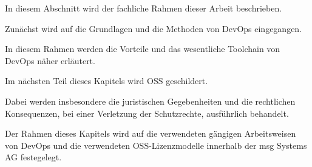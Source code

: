 In diesem Abschnitt wird der fachliche Rahmen dieser Arbeit beschrieben. 

Zunächst wird auf die Grundlagen und die Methoden von DevOps eingegangen. 

In diesem Rahmen werden die Vorteile und das wesentliche Toolchain von DevOps näher erläutert.  

Im nächsten Teil dieses Kapitels wird OSS geschildert. 

Dabei werden insbesondere die juristischen Gegebenheiten und die rechtlichen Konsequenzen, bei einer Verletzung der Schutzrechte, ausführlich behandelt. 

Der Rahmen dieses Kapitels wird auf die verwendeten gängigen Arbeitsweisen von DevOps und die verwendeten OSS-Lizenzmodelle innerhalb der msg Systems AG festegelegt. 